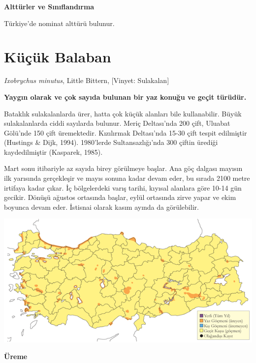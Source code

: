 \documentclass[
  a4paper,
  DIV=11,
  numbers=noendperiod]{scrreprt}
\begin{document}
\textbf{Alttürler ve Sınıflandırma}

Türkiye'de nominat alttürü bulunur.

\section{Küçük Balaban}\label{kuxfcuxe7uxfck-balaban}

\emph{Ixobrychus minutus}, Little Bittern, {[}Vinyet: Sulakalan{]}

\textbf{Yaygın olarak ve çok sayıda bulunan bir yaz konuğu ve geçit
türüdür.}

Bataklık sulakalanlarda ürer, hatta çok küçük alanları bile
kullanabilir. Büyük sulakalanlarda ciddi sayılarda bulunur. Meriç
Deltası'nda 200 çift, Uluabat Gölü'nde 150 çift üremektedir. Kızılırmak
Deltası'nda 15-30 çift tespit edilmiştir (Hustings \& Dijk, 1994).
1980'lerde Sultansazlığı'nda 300 çiftin ürediği kaydedilmiştir
(Kasparek, 1985).

Mart sonu itibariyle az sayıda birey görülmeye başlar. Ana göç dalgası
mayısın ilk yarısında gerçekleşir ve mayıs sonuna kadar devam eder, bu
sırada 2100 metre irtifaya kadar çıkar. İç bölgelerdeki varış tarihi,
kıyısal alanlara göre 10-14 gün gecikir. Dönüşü ağustos ortasında
başlar, eylül ortasında zirve yapar ve ekim boyunca devam eder. İstisnai
olarak kasım ayında da görülebilir.

\includegraphics{images/harita_Page_065.png}

\textbf{Üreme}
\end{document}
